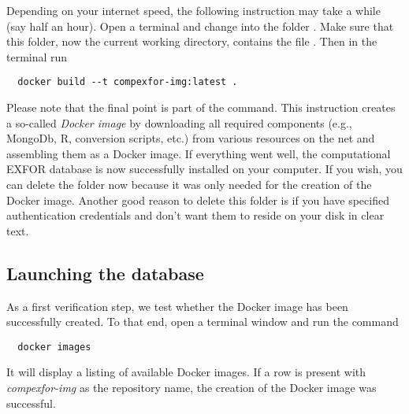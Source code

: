 \documentclass[12pt,a4paper]{scrartcl}
\begin{document}
 Depending on your internet speed, the following instruction may take a while (say half an hour).
 Open a terminal and change into the folder .
 Make sure that this folder, now the current working directory, contains the file .
Then in the terminal run
\begin{verbatim}
  docker build --t compexfor-img:latest . 
\end{verbatim}
 Please note that the final point is part of the command.
 This instruction creates a so-called \textit{Docker image} by downloading all required components (e.g., MongoDb, R, conversion scripts, etc.) from various resources on the net and assembling them as a Docker image.
 If everything went well, the computational EXFOR database is now successfully installed on your computer.
 If you wish, you can delete the folder  now because it was only needed for the creation of the Docker image.
 Another good reason to delete this folder is if you have specified authentication credentials and don't want them to reside on your disk in clear text.

 \subsection{Launching the database}
 \label{subsec:launch_database}
 As a first verification step, we test whether the Docker image has been successfully created.
 To that end, open a terminal window and run the command
\begin{verbatim}
  docker images
\end{verbatim}
 It will display a listing of available Docker images.
 If a row is present with \textit{compexfor-img} as the repository name, the creation of the Docker image was successful.
 
\end{document}

